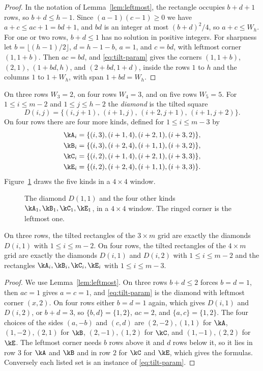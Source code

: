 \begin{proof}
In the notation of Lemma~\ref{lem:leftmost}, the rectangle occupies $b+d+1$ rows, so $b+d\le h-1$. Since $(a-1)(c-1)\ge0$ we have $a+c\le ac+1=bd+1$, and $bd$ is an integer at most $(b+d)^2/4$, so $a+c\le W_h$. For one or two rows, $b+d\le1$ has no solution in positive integers. For sharpness let $b=\lfloor(h-1)/2\rfloor$, $d=h-1-b$, $a=1$, and $c=bd$, with leftmost corner $(1,1+b)$. Then $ac=bd$, and \eqref{eq:tilt-param} gives the corners $(1,1+b)$, $(2,1)$, $(1+bd,h)$, and $(2+bd,1+d)$, inside the rows $1$ to $h$ and the columns $1$ to $1+W_h$, with span $1+bd=W_h$.
\end{proof}

On three rows $W_3=2$, on four rows $W_4=3$, and on five rows $W_5=5$. For $1\le i\le m-2$ and $1\le j\le h-2$ the \emph{diamond} is the tilted square
\[
D(i,j)=\{(i,j+1),\,(i+1,j),\,(i+2,j+1),\,(i+1,j+2)\}.
\]
On four rows there are four more kinds, defined for $1\le i\le m-3$ by
\begin{align*}
\kA_i&=\{(i,3),(i+1,4),(i+2,1),(i+3,2)\},\\
\kB_i&=\{(i,3),(i+2,4),(i+1,1),(i+3,2)\},\\
\kC_i&=\{(i,2),(i+1,4),(i+2,1),(i+3,3)\},\\
\kE_i&=\{(i,2),(i+2,4),(i+1,1),(i+3,3)\}.
\end{align*}
Figure~\ref{fig:tilted} draws the five kinds in a $4\times4$ window.

\begin{figure}[t]
\centering
\resizebox{\textwidth}{!}{}
\caption{The diamond $D(1,1)$ and the four other kinds $\kA_1,\kB_1,\kC_1,\kE_1$, in a $4\times4$ window. The ringed corner is the leftmost one.}
\label{fig:tilted}
\end{figure}

\begin{lemma}\label{lem:tilted-narrow}
On three rows, the tilted rectangles of the $3\times m$ grid are exactly the diamonds $D(i,1)$ with $1\le i\le m-2$. On four rows, the tilted rectangles of the $4\times m$ grid are exactly the diamonds $D(i,1)$ and $D(i,2)$ with $1\le i\le m-2$ and the rectangles $\kA_i,\kB_i,\kC_i,\kE_i$ with $1\le i\le m-3$.
\end{lemma}

\begin{proof}
We use Lemma~\ref{lem:leftmost}. On three rows $b+d\le2$ forces $b=d=1$, then $ac=1$ gives $a=c=1$, and \eqref{eq:tilt-param} is the diamond with leftmost corner $(x,2)$. On four rows either $b=d=1$ again, which gives $D(i,1)$ and $D(i,2)$, or $b+d=3$, so $\{b,d\}=\{1,2\}$, $ac=2$, and $\{a,c\}=\{1,2\}$. The four choices of the sides $(a,-b)$ and $(c,d)$ are $(2,-2),(1,1)$ for $\kA$, $(1,-2),(2,1)$ for $\kB$, $(2,-1),(1,2)$ for $\kC$, and $(1,-1),(2,2)$ for $\kE$. The leftmost corner needs $b$ rows above it and $d$ rows below it, so it lies in row $3$ for $\kA$ and $\kB$ and in row $2$ for $\kC$ and $\kE$, which gives the formulas. Conversely each listed set is an instance of \eqref{eq:tilt-param}.
\end{proof}

